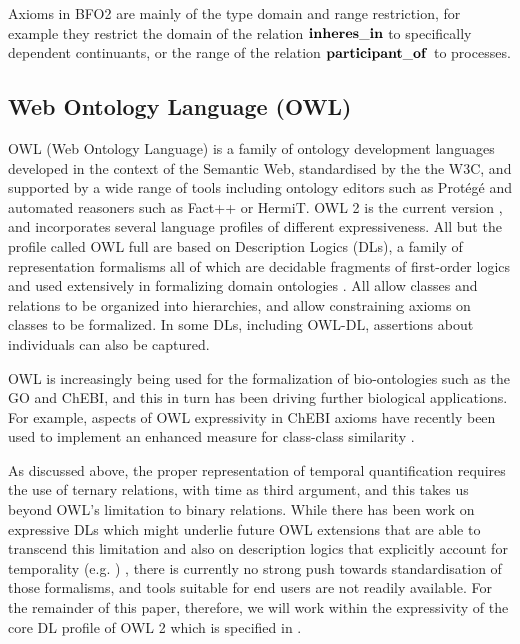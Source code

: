 Axioms in BFO2 are mainly of the type domain and range restriction, for example they restrict the domain of the relation $\mathrm{\mathbf{inheres\_in}}$ to specifically 
dependent continuants, or the range of the relation $\mathrm{\mathbf{participant\_of}}$ to processes.  



\subsection*{Web Ontology Language (OWL)}

OWL (Web Ontology Language) is a family of ontology development languages developed in the context of the Semantic Web, 
standardised by the the W3C, and supported by a wide range of tools including ontology editors such as Prot\'eg\'e 
and automated reasoners such as Fact++ or HermiT. 
OWL 2 is the current version \cite{grau2008}, and incorporates several language profiles of different expressiveness. All but the profile called OWL full are based on Description Logics (DLs), a family of
representation formalisms all of which are decidable fragments of first-order logics and used extensively in formalizing domain ontologies \cite{baader2007dlhandbook}. 
All allow classes and relations to be organized into hierarchies, and allow constraining axioms on classes to be formalized. In some DLs, including OWL-DL, assertions about individuals can also be captured. 

OWL is increasingly being used for the formalization of bio-ontologies such as the GO and ChEBI, and this in turn has been driving further biological applications. For example, aspects of OWL expressivity in ChEBI axioms have recently been used to implement an enhanced measure for class-class similarity \cite{ferreira2013exploiting}.


As discussed above, the proper representation of temporal quantification requires the use of ternary relations, with time as third argument, and this takes us beyond OWL's limitation to binary relations. While there has been work on expressive DLs which might underlie future OWL extensions that are able to transcend this limitation \cite{Calvanese:1997} and also on description logics that explicitly account for temporality (e.g. \cite{Wolter:2001}) , there is currently no strong push towards standardisation of those formalisms, and tools suitable for end users are not readily available. For the remainder of this paper, therefore, we will work within the expressivity of the core DL profile of OWL 2 which is specified in \cite{OWL2:direct}.  

